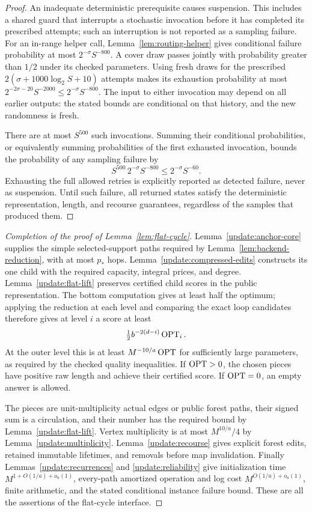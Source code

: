 \begin{proof}
An inadequate deterministic prerequisite causes suspension.
This includes a shared guard that interrupts a stochastic
invocation before it has completed its prescribed attempts;
such an interruption is not reported as a sampling failure.
For an in-range helper call, Lemma~\ref{lem:routing-helper}
gives conditional failure probability at most
$2^{-\sigma}S^{-800}$.  A cover draw passes jointly with
probability greater than $1/2$ under its checked parameters.
Using fresh draws for the prescribed
$2(\sigma+1000\log_2 S+10)$ attempts makes its exhaustion
probability at most
$2^{-2\sigma-20}S^{-2000}\le2^{-\sigma}S^{-800}$.
The input to either invocation may depend on all earlier
outputs: the stated bounds are conditional on that history,
and the new randomness is fresh.

There are at most $S^{500}$ such invocations.  Summing their
conditional probabilities, or equivalently summing probabilities
of the first exhausted invocation, bounds the probability of
any sampling failure by
\[
 S^{500}\,2^{-\sigma}S^{-800}
       \le2^{-\sigma}S^{-60}.
\]
Exhausting the full allowed retries is explicitly reported as
detected failure, never as suspension.  Until such failure, all
returned states satisfy the deterministic representation,
length, and recourse guarantees, regardless of the samples
that produced them.
\end{proof}

\begin{proof}[Completion of the proof of Lemma~\ref{lem:flat-cycle}]
Lemma~\ref{update:anchor-core} supplies the simple selected-support
paths required by Lemma~\ref{lem:backend-reduction}, with at most
$p_*$ hops.  Lemma~\ref{update:compressed-edits} constructs its one
child with the required capacity, integral prices, and degree.
Lemma~\ref{update:flat-lift} preserves certified child scores in
the public representation.  The bottom computation gives at
least half the optimum; applying the reduction at each level
and comparing the exact loop candidates therefore gives at
level $i$ a score at least
\[
             \tfrac12 b^{-2(d-i)}\operatorname{OPT}_i.
\]
At the outer level this is at least $M^{-10/a}\operatorname{OPT}$ for
sufficiently large parameters, as required by the checked
quality inequalities.  If $\operatorname{OPT}>0$, the chosen pieces have
positive raw length and achieve their certified score.  If
$\operatorname{OPT}=0$, an empty answer is allowed.

The pieces are unit-multiplicity actual edges or public forest
paths, their signed sum is a circulation, and their number has
the required bound by Lemma~\ref{update:flat-lift}.  Vertex
multiplicity is at most $M^{10/a}/4$ by
Lemma~\ref{update:multiplicity}.  Lemma~\ref{update:recourse}
gives explicit forest edits, retained immutable lifetimes, and
removals before map invalidation.  Finally
Lemmas~\ref{update:recurrences} and \ref{update:reliability}
give initialization time $M^{1+O(1/a)+o_a(1)}$, every-path
amortized operation and log cost $M^{O(1/a)+o_a(1)}$, finite
arithmetic, and the stated conditional instance failure bound.
These are all the assertions of the flat-cycle interface.
\end{proof}
